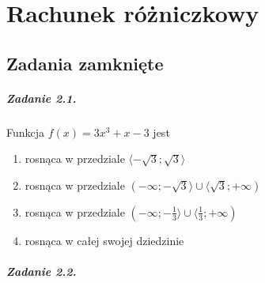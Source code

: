\chapter{Rachunek różniczkowy}

\section{Zadania zamknięte}

\paragraph{Zadanie 2.1.} Funkcja $f(x) = 3x^3 + x - 3$ jest
\begin{enumerate}[label=\alph*)]
	\item rosnąca w przedziale $ \langle -\sqrt{3}; \sqrt{3} \rangle $
	\item rosnąca w przedziale $ ( -\infty; -\sqrt{3} \rangle \cup \langle \sqrt{3}; +\infty ) $
	\item rosnąca w przedziale $ ( -\infty; -\frac{1}{3} \rangle \cup \langle \frac{1}{3}; +\infty ) $
	\item rosnąca w całej swojej dziedzinie
\end{enumerate}

\paragraph{Zadanie 2.2.} 